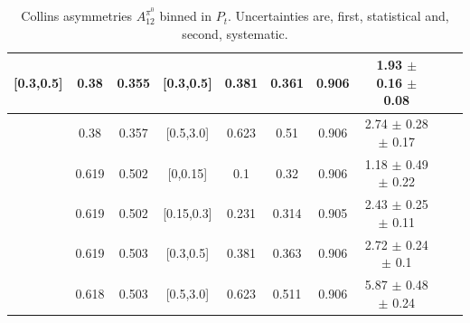 \documentclass[aps,prX,preprint,groupedaddress,linenumbers]{revtex4-1}
\begin{document}
\begin{table}[H]
\begin{tabular}{|c| c| c| c| c| c| c| c| c| c|}
[0.3,0.5]	&	0.38	        &	0.355	&	[0.3,0.5]	&	0.381	&	0.361	&	0.906	&1.93  $\pm$ 0.16  $\pm$ 0.08  		\\ \hline
[0.3,0.5]	&	0.38	        &	0.357	&	[0.5,3.0]	&	0.623	&	0.51	 &       0.906   &     2.74  $\pm$ 0.28  $\pm$ 0.17  			\\ \hline
\hline
[0.5,3.0]	&	0.619	&	0.502	&	[0,0.15]	&	0.1	        &	0.32	  &    0.906          &1.18  $\pm$ 0.49  $\pm$ 0.22  	\\ \hline
[0.5,3.0]	&	0.619	&	0.502	&	[0.15,0.3]	&	0.231	&	0.314	&	0.905    	&2.43  $\pm$ 0.25  $\pm$ 0.11  	\\ \hline
[0.5,3.0]	&	0.619	&	0.503	&	[0.3,0.5]	&	0.381	&	0.363	&	0.906    	&2.72  $\pm$ 0.24  $\pm$ 0.1   	\\ \hline
[0.5,3.0]	&	0.618	&	0.503	&	[0.5,3.0]	&	0.623	&	0.511	&	0.906   	&5.87  $\pm$ 0.48  $\pm$ 0.24  	\\ \hline
\end{tabular}
\caption[Collins asymmetries $A_{12}^{\pi^0}$ binned in $P_t$]{Collins asymmetries $A_{12}^{\pi^0}$ binned in $P_t$. Uncertainties are, first, statistical and, second, systematic.}
\label{tab:finalpi0ptbin}
\end{table}
\end{document}
